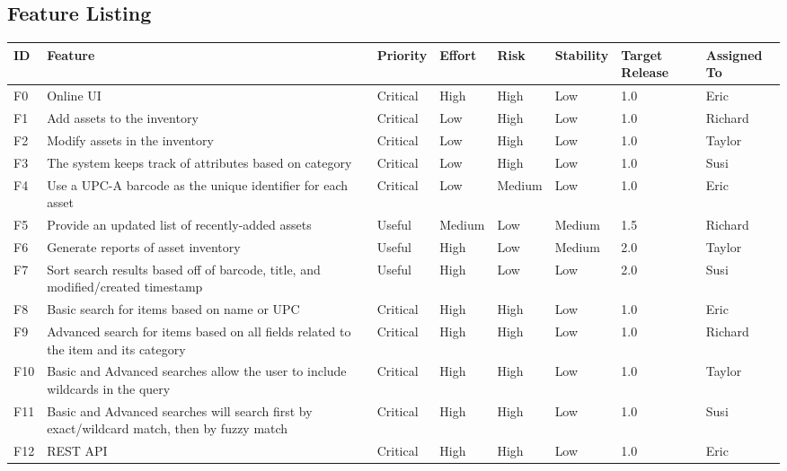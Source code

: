 \documentclass{article}
\begin{document}
\subsection{Feature Listing}
\begin{tabular}{ | p{0.15in} | p{2.0in} | p{0.5in} | p{0.5in} | p{0.5in} | p{0.6in} | p{0.5in} | p{0.65in} | }
\hline
\textbf{ID} & \textbf{Feature} & \textbf{Priority} & \textbf{Effort} & \textbf{Risk} & \textbf{Stability} & \textbf{Target Release} & \textbf{Assigned To} \\
\hline
\hline
F0 & Online UI & Critical & High & High & Low & 1.0 & Eric \\
\hline
F1 & Add assets to the inventory & Critical & Low & High & Low & 1.0 & Richard \\
\hline
F2 & Modify assets in the inventory & Critical & Low & High & Low & 1.0 & Taylor \\
\hline
F3 & The system keeps track of attributes based on category & Critical & Low & High & Low & 1.0 & Susi \\
\hline
F4 & Use a UPC-A barcode as the unique identifier for each asset & Critical & Low & Medium & Low & 1.0 & Eric \\
\hline
F5 & Provide an updated list of recently-added assets & Useful & Medium & Low & Medium & 1.5 & Richard \\
\hline
F6 & Generate reports of asset inventory & Useful & High & Low & Medium & 2.0 & Taylor \\
\hline
F7 & Sort search results based off of barcode, title, and modified/created timestamp & Useful & High & Low & Low & 2.0 & Susi \\
\hline
F8 & Basic search for items based on name or UPC & Critical & High & High & Low & 1.0 & Eric \\
\hline
F9 & Advanced search for items based on all fields related to the item and its category & Critical & High & High & Low & 1.0 & Richard \\
\hline
F10 & Basic and Advanced searches allow the user to include wildcards in the query & Critical & High & High & Low & 1.0 & Taylor \\
\hline
F11 & Basic and Advanced searches will search first by exact/wildcard match, then by fuzzy match & Critical & High & High & Low & 1.0 & Susi \\
\hline
F12 & REST API & Critical & High & High & Low & 1.0 & Eric \\
\hline
\end{tabular}\\
~\\
~\\
\end{document}
